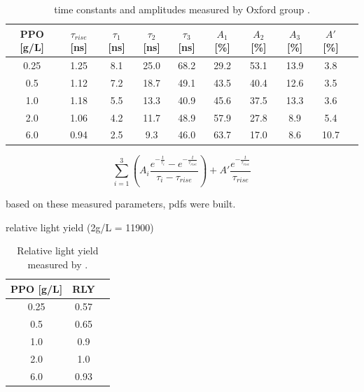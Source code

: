 \begin{table}[ht]
	\centering
	\caption{\label{oxfordMeasure} time constants and amplitudes measured by Oxford group \cite{oxfordMeasurement}.}	
	{\centering
		\begin{tabular*}{160mm}{c@{\extracolsep{\fill}}ccccccccc}
			\toprule 
			PPO [g/L] & $\tau_{rise}$ [ns] & $\tau_1$ [ns] & $\tau_2$ [ns] & $\tau_3$ [ns] & $A_1$ [\%]  & $A_2$ [\%]   & $A_3$ [\%]  & $A'$ [\%] \\
			\midrule
		 0.25 & 1.25 & 8.1 & 25.0 & 68.2 & 29.2 & 53.1 & 13.9 & 3.8\\
		 0.5  & 1.12 & 7.2 & 18.7 & 49.1 & 43.5 & 40.4 & 12.6 & 3.5 \\
		 1.0 & 1.18 & 5.5 & 13.3 & 40.9 &	45.6 & 37.5 & 13.3 & 3.6 \\
		 2.0 & 1.06 & 4.2 & 11.7 & 48.9 & 57.9 & 27.8 & 8.9 & 5.4	\\
		 6.0 & 0.94 & 2.5 & 9.3  & 46.0 & 63.7 & 17.0 & 8.6 & 10.7\\
			\bottomrule	
		\end{tabular*}
	}
\end{table}


\[
\sum_{i=1}^3 (A_i\frac{e^{-\frac{t}{\tau_i}}-e^{-\frac{t}{\tau_{rise}}}}{\tau_i-\tau_{rise}})+A'\frac{e^{-\frac{t}{\tau_{rise}}}}{\tau_{rise}}
\]

based on these measured parameters, pdfs were built. 



relative light yield (2g/L = 11900)
\begin{table}[ht]
	\centering
	\caption{\label{oxfordMeasure2}Relative light yield measured by \cite{oxfordMeasurement}.}	
	{\centering
		\begin{tabular*}{60mm}{c@{\extracolsep{\fill}}cc}
			\toprule 
			PPO [g/L] & RLY \\
			\midrule
			0.25 & 0.57\\
			0.5 & 0.65\\
			1.0 & 0.9\\
			2.0 & 1.0\\
			6.0 & 0.93\\
			\bottomrule	
		\end{tabular*}
	}
\end{table}


